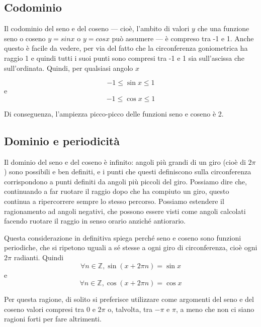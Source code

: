 \subsection{Codominio}

Il codominio del seno e del coseno --- cioè, l'ambito di valori $y$ che una funzione seno o coseno $y = sin x$ o $y = cos x$ può assumere --- è compreso tra -1 e 1. Anche questo è facile da vedere, per via del fatto che la circonferenza goniometrica ha raggio 1 e quindi tutti i suoi punti sono compresi tra -1 e 1 sia sull'ascissa che sull'ordinata. Quindi, per qualsiasi angolo $x$

\begin{equation}
-1 \leq \sin x \leq 1
\end{equation}
e
\begin{equation}
-1 \leq \cos x \leq 1
\end{equation}

Di conseguenza, l'ampiezza picco-picco delle funzioni seno e coseno è 2.


\subsection{Dominio e periodicità}

Il dominio del seno e del coseno è infinito: angoli più grandi di un giro (cioè di $2\pi$) sono possibili e ben definiti, e i punti che questi definiscono sulla circonferenza corrispondono a punti definiti da angoli più piccoli del giro. Possiamo dire che, continuando a far ruotare il raggio dopo che ha compiuto un giro, questo continua a ripercorrere sempre lo stesso percorso. Possiamo estendere il ragionamento ad angoli negativi, che possono essere visti come angoli calcolati facendo ruotare il raggio in senso orario anziché antiorario.

Questa considerazione in definitiva spiega perché seno e coseno sono funzioni periodiche, che si ripetono uguali a sé stesse a ogni giro di circonferenza, cioè ogni $2 \pi$ radianti. Quindi
\begin{equation}
\forall n \in \mathbb{Z}, \sin(x + 2 \pi n) = \sin x
\end{equation}
e
\begin{equation}
\forall n \in \mathbb{Z}, \cos(x + 2 \pi n) = \cos x
\end{equation}

Per questa ragione, di solito si preferisce utilizzare come argomenti del seno e del coseno valori compresi tra 0 e $2 \pi$ o, talvolta, tra $-\pi$ e $\pi$, a meno che non ci siano ragioni forti per fare altrimenti.





